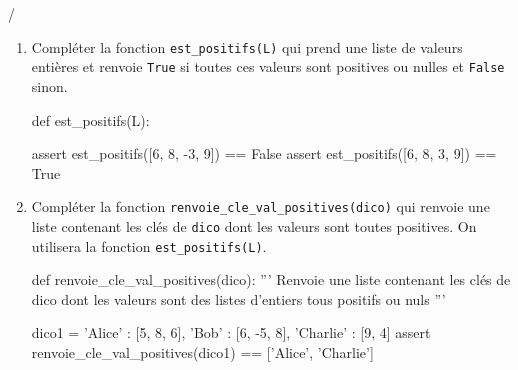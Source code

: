 \documentclass[a4paper]{article}
\begin{document}
\begin{exerciceinterro}{\hspace{2cm}\dotfill/}{}

\begin{enumerate}
	\item Compléter la fonction \verb+est_positifs(L)+ qui prend une liste de valeurs entières et renvoie \verb+True+ si toutes ces valeurs sont positives ou nulles et \verb+False+ sinon.
	
\begin{CodePythontexAlt}[Largeur=17cm,
TaillePolice = \normalsize, 
EspacementVertical = 1.2,
Lignes=false]{}
def est_positifs(L):
    
      
    
    
    
    
	
assert est_positifs([6, 8, -3, 9]) == False
assert est_positifs([6, 8, 3, 9]) == True
\end{CodePythontexAlt}
	

\item Compléter la fonction \verb+renvoie_cle_val_positives(dico)+ qui renvoie une liste contenant les clés de \verb+dico+ dont les valeurs sont toutes positives. On utilisera la fonction \verb+est_positifs(L)+.

\begin{CodePythontexAlt}[Largeur=17cm,
TaillePolice = \normalsize, 
EspacementVertical = 1.2,
Lignes=false]{}
def renvoie_cle_val_positives(dico):
	''' Renvoie une liste contenant les clés de dico dont 
	les valeurs sont des listes d'entiers tous positifs ou nuls '''
	
	
	
	
	
	
		
	
	
	
dico1 = {'Alice' : [5, 8, 6], 'Bob' : [6, -5, 8], 'Charlie' : [9, 4]}	
assert renvoie_cle_val_positives(dico1) == ['Alice', 'Charlie']
\end{CodePythontexAlt}
\end{enumerate}

\end{exerciceinterro}
\end{document}
